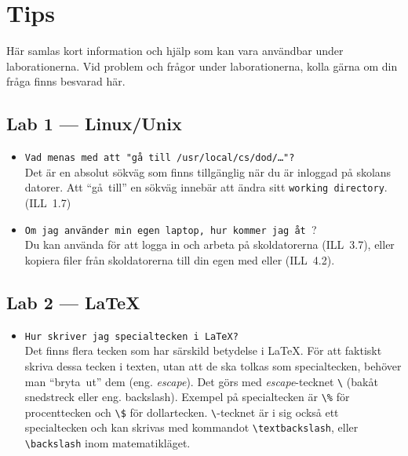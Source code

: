 \documentclass[fleqn, article, a4paper]{memoir}
\begin{document}
\newpage
\section{Tips}

Här samlas kort information och hjälp som kan vara användbar under laborationerna. Vid problem och frågor under laborationerna, kolla gärna om din fråga finns besvarad här.

\subsection{Lab 1 --- Linux/Unix}
\begin{itemize}
	\item \texttt{Vad menas med att "gå till /usr/local/cs/dod/\dots"?}\\
	      Det är en absolut sökväg som finns tillgänglig när du är inloggad på skolans datorer. Att ``gå~till'' en sökväg innebär att ändra sitt \texttt{working directory}. (ILL~1.7)
	\item \texttt{Om jag använder min egen laptop, hur kommer jag åt }?\\
	      Du kan använda  för att logga in och arbeta på skoldatorerna (ILL~3.7), eller kopiera filer från skoldatorerna till din egen med  eller  (ILL~4.2).
\end{itemize}

\subsection{Lab 2 --- \LaTeX}

\begin{itemize}
	\item \texttt{Hur skriver jag specialtecken i \LaTeX{}?}\\
	      Det finns flera tecken som har särskild betydelse i \LaTeX{}. För att faktiskt skriva dessa tecken i texten, utan att de ska tolkas som specialtecken, behöver man ``bryta~ut'' dem (eng. \emph{escape}). Det görs med \emph{escape}-tecknet \texttt{\textbackslash} (bakåt snedstreck eller eng. backslash). Exempel på specialtecken är \texttt{\textbackslash\%} för procenttecken och \texttt{\textbackslash\$} för dollartecken. \texttt{\textbackslash}-tecknet är i sig också ett specialtecken och kan skrivas med kommandot \texttt{\textbackslash{textbackslash}}, eller \texttt{\textbackslash{backslash}} inom matematikläget.

\end{itemize}
\end{document}
